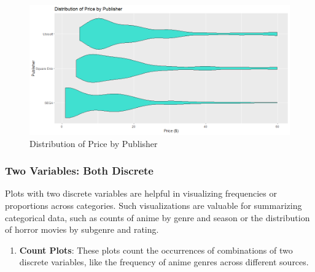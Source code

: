 \documentclass[
]{book}
\newenvironment{Shaded}{\begin{snugshade}}{\end{snugshade}}
\newcommand{\AttributeTok}[1]{\textcolor[rgb]{0.13,0.29,0.53}{#1}}
\newcommand{\FunctionTok}[1]{\textcolor[rgb]{0.13,0.29,0.53}{\textbf{#1}}}
\newcommand{\NormalTok}[1]{#1}
\newcommand{\SpecialCharTok}[1]{\textcolor[rgb]{0.81,0.36,0.00}{\textbf{#1}}}
\newcommand{\StringTok}[1]{\textcolor[rgb]{0.31,0.60,0.02}{#1}}
\providecommand{\tightlist}{%
  \setlength{\itemsep}{0pt}\setlength{\parskip}{0pt}}
\begin{document}
\begin{Shaded}
\end{Shaded}

\begin{figure}
\centering
\includegraphics[width=1\textwidth,height=\textheight]{images/violin_plot.png}
\caption{Distribution of Price by Publisher}
\end{figure}

\subsubsection*{Two Variables: Both Discrete}\label{two-variables-both-discrete}

Plots with two discrete variables are helpful in visualizing frequencies or proportions across categories. Such visualizations are valuable for summarizing categorical data, such as counts of anime by genre and season or the distribution of horror movies by subgenre and rating.

\begin{enumerate}
\def\labelenumi{\arabic{enumi}.}
\tightlist
\item
  \textbf{Count Plots}: These plots count the occurrences of combinations of two discrete variables, like the frequency of anime genres across different sources.
\end{enumerate}
\end{document}

